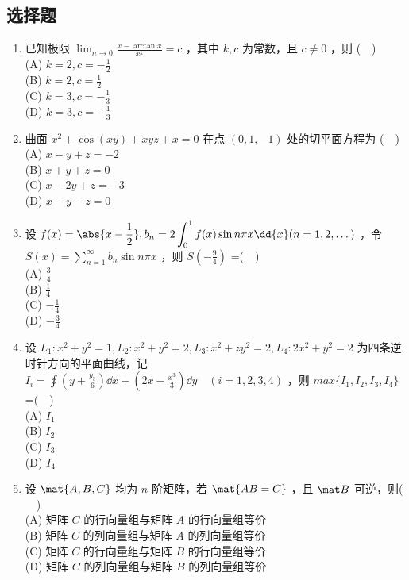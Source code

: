 
\subsection{选择题}
\begin{enumerate}
\item 已知极限 $\lim_{n\to 0}\frac{x-\arctan x}{x^k}=c$ ，其中 $k,c$ 为常数，且 $c \neq 0$ ，则 ($\quad$)\\
(A) $\displaystyle k=2,c=-\frac{1}{2}$\\
(B) $\displaystyle k=2,c=\frac{1}{2}$\\
(C) $\displaystyle k=3,c=-\frac{1}{3}$\\
(D) $\displaystyle k=3,c=-\frac{1}{3}$
\item  曲面 $x^2+\cos (xy)+xyz+x=0$ 在点 $(0,1,-1)$ 处的切平面方程为 ($\quad$)\\
(A) $x-y+z=-2$\\
(B) $x+y+z=0$\\
(C) $x-2y+z=-3$\\
(D)  $x-y-z=0$
\item  设 $\displaystyle f(x)=\abs{x-\frac{1}{2}},b_n=2\int_{0}^{1}f(x)\sin n\pi x\dd{x} (n=1,2,\dots)$ ，令 $\displaystyle S(x)=\sum_{n=1}^\infty b_n \sin n\pi x$ ，则 $S(-\frac{9}{4})$ =($\quad$)\\
(A) $\displaystyle \frac{3}{4}$\\
(B) $\displaystyle \frac{1}{4}$\\
(C) $\displaystyle -\frac{1}{4}$\\
(D)  $\displaystyle -\frac{3}{4}$
\item  设 $L_1:x^2+y^2=1,L_2:x^2+y^2=2,  L_3:x^2+zy^2=2, L_4:2x^2+y^2=2$  为四条逆时针方向的平面曲线，记 $\displaystyle I_i=\oint (y+\frac{y_3}{6})\dd{x}+(2x-\frac{x^3}{3})\dd{y}\quad (i=1,2,3,4)$  ，则 $max\{I_1,I_2,I_3,I_4\}$ =($\quad$)\\
(A) $I_1$\\
(B)  $I_2$\\
(C)  $I_3$\\
(D)  $I_4$

\item 设 $\mat {A,B,C}$ 均为 $n$ 阶矩阵，若 $\mat {AB=C}$ ，且 $\mat B$ 可逆，则($\quad$)\\
(A) 矩阵 $C$ 的行向量组与矩阵 $A$ 的行向量组等价\\
(B) 矩阵 $C$ 的列向量组与矩阵 $A$ 的列向量组等价\\
(C) 矩阵 $C$ 的行向量组与矩阵 $B$ 的行向量组等价\\
(D) 矩阵 $C$ 的列向量组与矩阵 $B$ 的列向量组等价


\end{enumerate}
